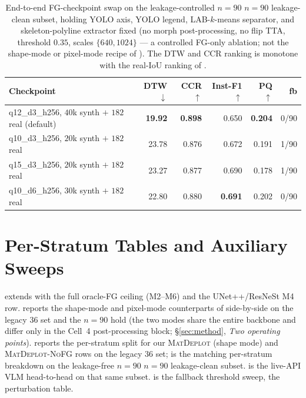 \documentclass{article}
\begin{document}
\begin{table}[h]
\centering
\caption{End-to-end FG-checkpoint swap on the leakage-controlled
$n{=}90$ $n{=}90$ leakage-clean subset, holding YOLO axis, YOLO legend,
LAB-$k$-means separator, and skeleton-polyline extractor fixed
(no morph post-processing, no flip TTA, threshold $0.35$, scales
$\{640,1024\}$ --- a controlled FG-only ablation; not the
shape-mode or pixel-mode recipe of ).
The DTW and CCR ranking is monotone with the real-IoU ranking of
.}
\label{tab:fg-ablation}
\small
\begin{tabular}{lrrrrr}
\toprule
Checkpoint & DTW$\downarrow$ & CCR$\uparrow$ & Inst-F1$\uparrow$ &
             PQ$\uparrow$ & fb \\
\midrule
q12\_d3\_h256, $40$k synth $+$ $182$ real (default) & \textbf{19.92} & \textbf{0.898} & 0.650 & \textbf{0.204} & 0/90 \\
q10\_d3\_h256, $20$k synth $+$ $182$ real             & 23.78 & 0.876 & 0.672 & 0.191 & 1/90 \\
q15\_d3\_h256, $20$k synth $+$ $182$ real             & 23.27 & 0.877 & 0.690 & 0.178 & 1/90 \\
q10\_d6\_h256, $30$k synth $+$ $182$ real             & 22.80 & 0.880 & \textbf{0.691} & 0.202 & 0/90 \\
\bottomrule
\end{tabular}
\end{table}

\section{Per-Stratum Tables and Auxiliary Sweeps}
\label{app:strata}\label{app:ablations}\label{app:agent-ready}
\label{app:ablations}
\setcounter{table}{0}\setcounter{figure}{0}

 extends  with the full
oracle-FG ceiling (M2--M6) and the UNet++/ResNeSt M4 row.
 reports the shape-mode and pixel-mode
counterparts of  side-by-side on the legacy $36$ set and
the $n{=}90$ hold (the two modes share the entire backbone and differ
only in the Cell~4 post-processing block; \S\ref{sec:method},
\emph{Two operating points}).  reports the
per-stratum split for our \textsc{MatDeplot} (shape mode) and
\textsc{MatDeplot-NoFG} rows on the legacy $36$ set;
 is the matching per-stratum breakdown on the
leakage-free $n{=}90$ $n{=}90$ leakage-clean subset.
 is the live-API VLM head-to-head on
that same subset.  is the fallback threshold
sweep,  the perturbation table.
\end{document}

